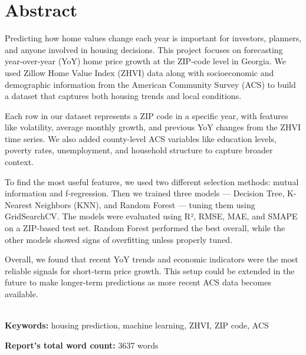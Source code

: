 \chapter*{\center \Large  Abstract}

Predicting how home values change each year is important for investors, planners, and anyone involved in housing decisions. This project focuses on forecasting year-over-year (YoY) home price growth at the ZIP-code level in Georgia. We used Zillow Home Value Index (ZHVI) data along with socioeconomic and demographic information from the American Community Survey (ACS) to build a dataset that captures both housing trends and local conditions.

Each row in our dataset represents a ZIP code in a specific year, with features like volatility, average monthly growth, and previous YoY changes from the ZHVI time series. We also added county-level ACS variables like education levels, poverty rates, unemployment, and household structure to capture broader context.

To find the most useful features, we used two different selection methods: mutual information and f-regression. Then we trained three models — Decision Tree, K-Nearest Neighbors (KNN), and Random Forest — tuning them using GridSearchCV. The models were evaluated using R², RMSE, MAE, and SMAPE on a ZIP-based test set. Random Forest performed the best overall, while the other models showed signs of overfitting unless properly tuned.

Overall, we found that recent YoY trends and economic indicators were the most reliable signals for short-term price growth. This setup could be extended in the future to make longer-term predictions as more recent ACS data becomes available.

~\\[1cm]
\noindent\textbf{Keywords:} housing prediction, machine learning, ZHVI, ZIP code, ACS

\vfill
\noindent
\textbf{Report's total word count:} 3637 words





